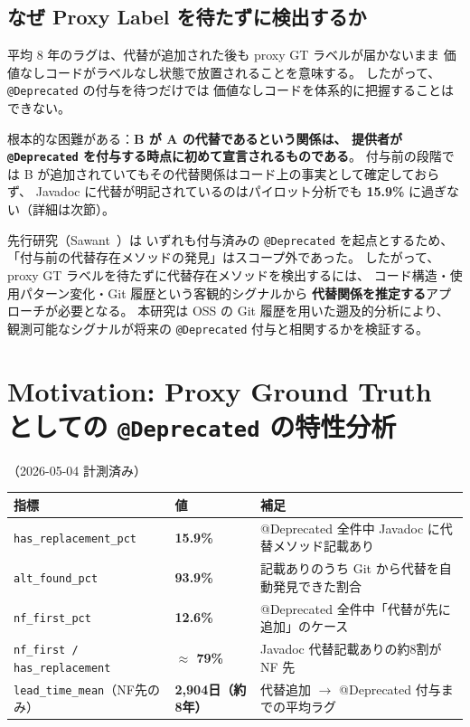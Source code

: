 \documentclass[a4paper,12pt]{article}
\begin{document}
\subsection*{なぜ Proxy Label を待たずに検出するか}

平均 8 年のラグは、代替が追加された後も proxy GT ラベルが届かないまま
価値なしコードがラベルなし状態で放置されることを意味する。
したがって、\texttt{@Deprecated} の付与を待つだけでは
価値なしコードを体系的に把握することはできない。

根本的な困難がある：\textbf{B が A の代替であるという関係は、
提供者が \texttt{@Deprecated} を付与する時点に初めて宣言されるものである}。
付与前の段階では B が追加されていてもその代替関係はコード上の事実として確定しておらず、
Javadoc に代替が明記されているのはパイロット分析でも \textbf{15.9\%} に過ぎない（詳細は次節）。

先行研究（Sawant~\cite{sawant2018why-deprecated,sawant2018deprecation-needs,sawant2019api-evolution}）は
いずれも付与済みの \texttt{@Deprecated} を起点とするため、
「付与前の代替存在メソッドの発見」はスコープ外であった。
したがって、proxy GT ラベルを待たずに代替存在メソッドを検出するには、
コード構造・使用パターン変化・Git 履歴という客観的シグナルから
\textbf{代替関係を推定する}アプローチが必要となる。
本研究は OSS の Git 履歴を用いた遡及的分析により、
観測可能なシグナルが将来の \texttt{@Deprecated} 付与と相関するかを検証する。

\section{Motivation: Proxy Ground Truth としての \texttt{@Deprecated} の特性分析}

（2026-05-04 計測済み）

\begin{tabular}{|p{5cm}|p{4cm}|p{5cm}|}
  \hline
  \textbf{指標} & \textbf{値} & \textbf{補足} \\
  \hline
  \texttt{has\_replacement\_pct} & \textbf{15.9\%} & @Deprecated 全件中 Javadoc に代替メソッド記載あり \\
  \hline
  \texttt{alt\_found\_pct} & \textbf{93.9\%} & 記載ありのうち Git から代替を自動発見できた割合 \\
  \hline
  \texttt{nf\_first\_pct} & \textbf{12.6\%} & @Deprecated 全件中「代替が先に追加」のケース \\
  \hline
  \texttt{nf\_first / has\_replacement} & \textbf{$\approx$ 79\%} & Javadoc 代替記載ありの約8割が NF 先 \\
  \hline
  \texttt{lead\_time\_mean}（NF先のみ） & \textbf{2,904日（約8年）} & 代替追加 $\rightarrow$ @Deprecated 付与までの平均ラグ \\
  \hline
\end{tabular}
\end{document}
